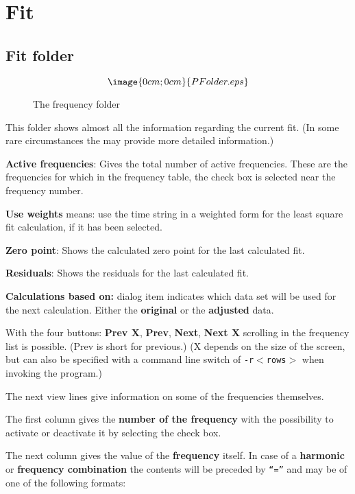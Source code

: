 \section{Fit}%
\label{period.detailed}

\subsection{Fit folder}%
\label{period.folder}

\begin{figure}[h]
$$\image{0cm;0cm}{PFolder.eps}$$%
\caption{The frequency folder}%
\label{period.folder.dialog}
\end{figure}

This folder shows almost all the information regarding the current fit. 
(In some rare circumstances the 
may provide more detailed information.)

{\bf Active frequencies}:
Gives the total number of active frequencies.
These are the frequencies for which in the frequency table,
the check box is selected near the frequency number.

{\bf Use weights}
means: use the time string in a weighted form for the
least square fit calculation, if it has been selected.

{\bf Zero point}:
Shows the calculated zero point for the last calculated fit.

{\bf Residuals}:
Shows the residuals for the last calculated fit.

{\bf Calculations based on:} dialog item indicates which data set
will be used for the next calculation. Either the {\bf original} 
or the {\bf adjusted} data.

With the four buttons:
{\bf Prev X},
{\bf Prev},
{\bf Next},
{\bf Next X}
scrolling in the frequency list is possible.
(Prev is short for previous.)
(X depends on the size of the screen, 
but can also be specified with a 
command line switch of {\tt -r$ <$rows$> $} when invoking the 
program.)

The next view lines give information on some of the frequencies themselves.

The first column gives the {\bf number of the frequency}
with the possibility to activate or deactivate it by
selecting the check box.

The next column gives the value of the {\bf frequency} itself.
In case of a {\bf harmonic} or {\bf frequency combination}
the contents will be preceded by {\tt``=''} and may be 
of one of the following formats:

